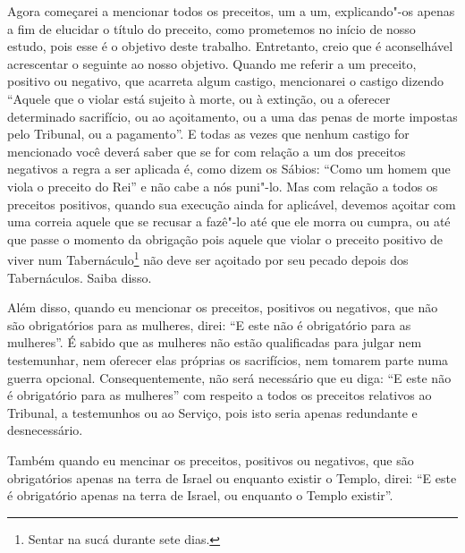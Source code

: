 Agora começarei a mencionar todos os preceitos, um a um, explicando"-os
apenas a fim de elucidar o título do preceito, como prometemos no início
de nosso estudo, pois esse é o objetivo deste trabalho. Entretanto,
creio que é aconselhável acrescentar o seguinte ao nosso objetivo.
Quando me referir a um preceito, positivo ou negativo, que acarreta
algum castigo, mencionarei o castigo dizendo ``Aquele que o violar está
sujeito à morte, ou à extinção, ou a oferecer determinado sacrifício, ou
ao açoitamento, ou a uma das penas de morte impostas pelo Tribunal, ou a
pagamento''. E todas as vezes que nenhum castigo for mencionado você
deverá saber que se for com relação a um dos preceitos negativos a regra
a ser aplicada é, como dizem os Sábios: ``Como um homem que viola o
preceito do Rei'' e não cabe a nós puni"-lo. Mas com relação a todos os
preceitos positivos, quando sua execução ainda for aplicável, devemos
açoitar com uma correia aquele que se recusar a fazê"-lo até que
ele morra ou cumpra, ou até que passe o momento da obrigação pois aquele
que violar o preceito positivo de viver num
Tabernáculo\footnote{Sentar na sucá\starr{} durante sete dias.} não deve ser açoitado por seu pecado depois dos Tabernáculos. Saiba disso.

Além disso, quando eu mencionar os preceitos, positivos ou negativos,
que não são obrigatórios para as mulheres, direi: ``E este não é
obrigatório para as mulheres''. É sabido que as mulheres não estão
qualificadas para julgar nem testemunhar, nem oferecer elas próprias os
sacrifícios, nem tomarem parte numa guerra opcional. Consequentemente,
não será necessário que eu diga: ``E este não é obrigatório para as
mulheres'' com respeito a todos os preceitos relativos ao Tribunal, a
testemunhos ou ao Serviço, pois isto seria apenas redundante e
desnecessário.

Também quando eu mencinar os preceitos, positivos ou negativos, que são
obrigatórios apenas na terra de Israel ou enquanto existir o Templo,
direi: ``E este é obrigatório apenas na terra de Israel, ou enquanto o
Templo existir''.

